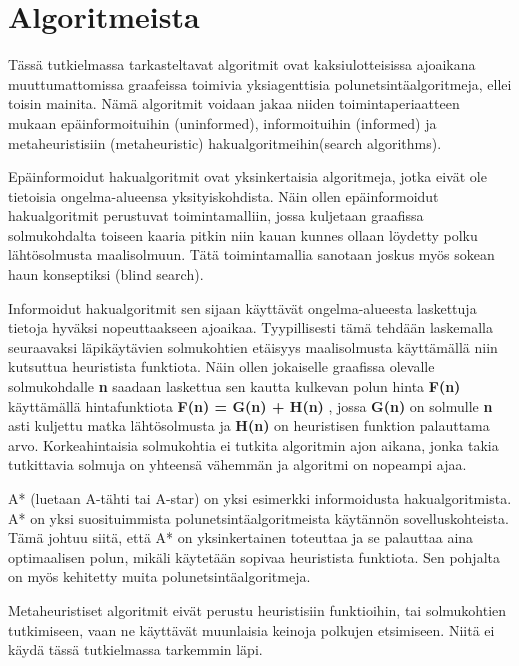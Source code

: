 \section{Algoritmeista}\label{algoritmeista}
Tässä tutkielmassa tarkasteltavat algoritmit ovat kaksiulotteisissa 
ajoaikana muuttumattomissa graafeissa toimivia yksiagenttisia 
polunetsintäalgoritmeja, ellei toisin mainita. Nämä algoritmit voidaan jakaa 
niiden toimintaperiaatteen mukaan epäinformoituihin (uninformed), 
informoituihin (informed) ja metaheuristisiin (metaheuristic) 
hakualgoritmeihin(search algorithms).\cite{applSciLawande}\par
	Epäinformoidut hakualgoritmit ovat yksinkertaisia algoritmeja, jotka 
eivät ole tietoisia ongelma-alueensa yksityiskohdista. Näin ollen 
epäinformoidut hakualgoritmit perustuvat toimintamalliin, jossa kuljetaan 
graafissa solmukohdalta toiseen kaaria pitkin niin kauan kunnes ollaan 
löydetty polku lähtösolmusta maalisolmuun. Tätä toimintamallia sanotaan 
joskus myös sokean haun konseptiksi (blind search).\cite{applSciLawande}\par
	Informoidut hakualgoritmit sen sijaan käyttävät ongelma-alueesta 
laskettuja tietoja hyväksi nopeuttaakseen ajoaikaa. Tyypillisesti tämä 
tehdään laskemalla seuraavaksi läpikäytävien solmukohtien etäisyys 
maalisolmusta käyttämällä niin kutsuttua heuristista funktiota. Näin ollen 
jokaiselle graafissa olevalle solmukohdalle \textbf{n} saadaan laskettua sen 
kautta kulkevan polun hinta \textbf{F(n)} käyttämällä hintafunktiota 
\textbf{F(n) = G(n) + H(n)} , jossa \textbf{G(n)} on solmulle \textbf{n} 
asti kuljettu matka lähtösolmusta ja \textbf{H(n)} on heuristisen funktion 
palauttama arvo. Korkeahintaisia solmukohtia ei tutkita algoritmin ajon 
aikana, jonka takia tutkittavia solmuja on yhteensä vähemmän ja algoritmi on 
nopeampi ajaa.\cite{applSciLawande}\par
	A* (luetaan A-tähti tai A-star) on yksi esimerkki informoidusta 
hakualgoritmista. A* on yksi suosituimmista polunetsintäalgoritmeista 
käytännön sovelluskohteista. Tämä johtuu siitä, että A* on yksinkertainen 
toteuttaa ja se palauttaa aina optimaalisen polun, mikäli käytetään 
sopivaa heuristista funktiota.\cite{MathewAndMalathy} Sen pohjalta on 
myös kehitetty muita polunetsintäalgoritmeja.\cite{applSciLawande}\par
	Metaheuristiset algoritmit eivät perustu heuristisiin funktioihin, tai 
solmukohtien tutkimiseen, vaan ne käyttävät muunlaisia keinoja polkujen 
etsimiseen.\cite{applSciLawande} Niitä ei käydä tässä tutkielmassa tarkemmin 
läpi.

